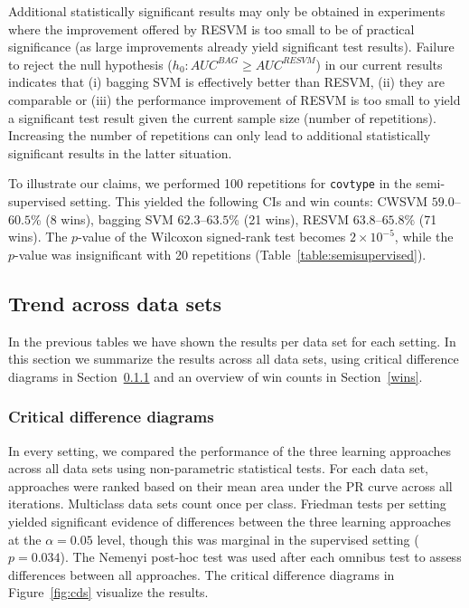 Additional statistically significant results may only be obtained in experiments where the improvement offered by RESVM is too small to be of practical significance (as large improvements already yield significant test results). Failure to reject the null hypothesis ($h_0: AUC^{BAG} \geq AUC^{RESVM}$) in our current results indicates that (i) bagging SVM is effectively better than RESVM, (ii) they are comparable or (iii) the performance improvement of RESVM is too small to yield a significant test result given the current sample size (number of repetitions). Increasing the number of repetitions can only lead to additional statistically significant results in the latter situation. 

To illustrate our claims, we performed 100 repetitions for \texttt{covtype} in the semi-supervised setting. This yielded the following CIs and win counts: CWSVM $59.0$--$60.5$\% (8 wins), bagging SVM $62.3$--$63.5$\% (21 wins), RESVM $63.8$--$65.8\%$ (71 wins). The $p$-value of the Wilcoxon signed-rank test becomes $2\times 10^{-5}$, while the $p$-value was insignificant with 20 repetitions (Table~\ref{table:semisupervised}).

\subsection{Trend across data sets}
In the previous tables we have shown the results per data set for each setting. In this section we summarize the results across all data sets, using critical difference diagrams \citep{demvsar2006statistical} in Section~\ref{cds} and an overview of win counts in Section~\ref{wins}.

\subsubsection{Critical difference diagrams} \label{cds}
In every setting, we compared the performance of the three learning approaches across all data sets using non-parametric statistical tests. For each data set, approaches were ranked based on their mean area under the PR curve across all iterations. Multiclass data sets count once per class. Friedman tests per setting yielded significant evidence of differences between the three learning approaches at the $\alpha=0.05$ level, though this was marginal in the supervised setting ($p=0.034$). The Nemenyi post-hoc test \citep{nemenyi1962distribution} was used after each omnibus test to assess differences between all approaches. The critical difference diagrams in Figure~\ref{fig:cds} visualize the results.

